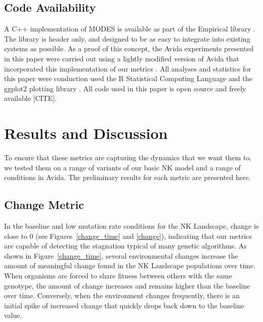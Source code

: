 \documentclass[letterpaper]{article}
\begin{document}
\subsection{Code Availability}
A C++ implementation of MODES is available as part of the Empirical library \citep{charles_ofria_2018_1439475}. The library is header only, and designed to be as easy to integrate into existing systems as possible. As a proof of this concept, the Avida experiments presented in this paper were carried out using a lightly modified version of Avida that incorporated this implementation of our metrics \citep{david_bryson_2018_1439479}. All analyses and statistics for this paper were conduction used the R Statistical Computing Language \citep{r_core_team_r:_2017} and the ggplot2 plotting library \citep{wickham_ggplot2_2016}. All code used in this paper is open source and freely available [CITE].


\section{Results and Discussion}
To ensure that these metrics are capturing the dynamics that we want them to, we tested them on a range of variants of our basic NK model and a range of conditions in Avida. The preliminary results for each metric are presented here.

\subsection{Change Metric}
In the baseline and low mutation rate conditions for the NK Landscape, change is close to 0 (see Figures~\ref{change_time} and \ref{change}), indicating that our metrics are capable of detecting the stagnation typical of many genetic algorithms. As shown in Figure~\ref{change_time}, several environmental changes increase the amount of meaningful change found in the NK Landscape populations over time. When organisms are forced to share fitness between others with the same genotype, the amount of change increases and remains higher than the baseline over time. Conversely, when the environment changes frequently, there is an initial spike of increased change that quickly drops back down to the baseline value.
\end{document}
